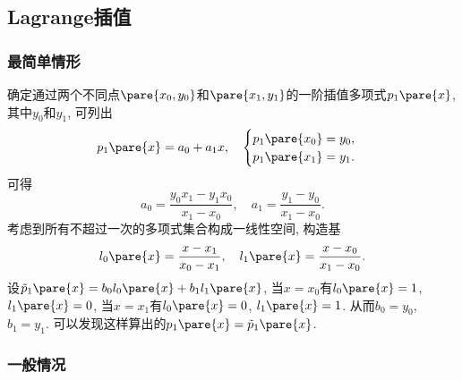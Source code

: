 \documentclass[hidelinks]{ctexart}
\begin{document}

\subsection{Lagrange插值} %
\label{sub:lagrange插值}

\subsubsection{最简单情形} %
\label{ssub:最简单情形}

确定通过两个不同点$\pare{x_0,y_0}$和$\pare{x_1,y_1}$的一阶插值多项式$p_1\pare{x}$, 其中$y_0$和$y_1$, 可列出
\[ p_1\pare{x} = a_0 + a_1 x,\quad \begin{cases}
    p_1\pare{x_0} = y_0, \\
    p_1\pare{x_1} = y_1.
\end{cases} \]
可得
\[ a_0 = \frac{y_0 x_1 - y_1 x_0}{x_1 - x_0},\quad a_1 = \frac{y_1 - y_0}{x_1 - x_0}. \]
考虑到所有不超过一次的多项式集合构成一线性空间, 构造基
\[ l_0\pare{x} = \frac{x - x_1}{x_0 - x_1},\quad l_1\pare{x} = \frac{x-x_0}{x_1 - x_0}. \]
设$\tilde{p}_1\pare{x} = b_0l_0\pare{x} + b_1l_1\pare{x}$, 当$x=x_0$有$l_0\pare{x} = 1$, $l_1\pare{x} = 0$, 当$x=x_1$有$l_0\pare{x} = 0$, $l_1\pare{x} = 1$. 从而$b_0 = y_0$, $b_1 = y_1$. 可以发现这样算出的$p_1\pare{x} = \tilde{p}_1\pare{x}$.


\subsubsection{一般情况} %
\label{ssub:一般情况}
\end{document}
